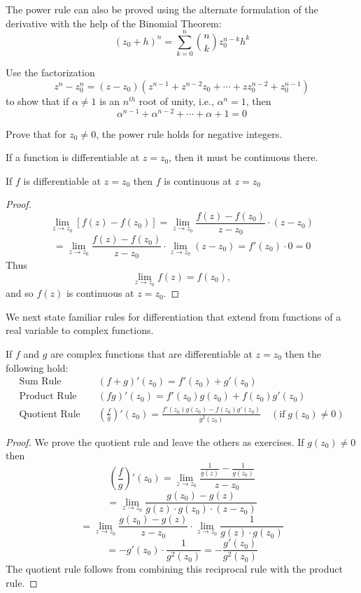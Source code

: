 \documentclass[handout]{ximera}
\begin{document}
\begin{remark}
The power rule can also be proved using the alternate formulation of the derivative with the help of the Binomial Theorem:
\[
(z_0 + h)^n = \sum_{k = 0}^n \binom{n}{k} z_0^{n-k} h^k
\]
\end{remark}


\begin{problem}
Use the factorization 
\[
z^n - z_0^n = (z-z_0)\left(z^{n-1} + z^{n-2}z_0 + \cdots + zz_0^{n-2} + z_0^{n-1} \right)
\]
to show that if $\alpha \neq 1$ is an $n^{th}$ root of unity, i.e., $\alpha^n = 1$, then
\[
\alpha^{n-1} + \alpha^{n-2} + \cdots + \alpha + 1 = 0
\]
\end{problem}

\begin{problem}
Prove that for $z_0 \neq 0$, the power rule holds for negative integers.
\end{problem}

If a function is differentiable at $z= z_0$, then it must be continuous there.
\begin{theorem}
If $f$ is differentiable at $z = z_0$ then $f$ is continuous at $z = z_0$
\end{theorem}
\begin{proof}
\[
\lim_{z\to z_0} \left[f(z) - f(z_0)\right] = \lim_{z\to z_0} \frac{f(z) - f(z_0)}{z-z_0} \cdot (z-z_0)
\]
\[
= \lim_{z\to z_0} \frac{f(z) - f(z_0)}{z-z_0} \cdot \lim_{z\to z_0}(z-z_0) = f'(z_0) \cdot 0 = 0
\]
Thus
\[
 \lim_{z\to z_0} f(z) = f(z_0),
 \]
 and so $f(z)$ is continuous at $z = z_0$.
\end{proof}
We next state familiar rules for differentiation that extend from functions of a real variable to complex functions.

\begin{theorem}
If $f$ and $g$ are complex functions that are differentiable at $z = z_0$ then the following hold:
\begin{align*}
\mbox{Sum Rule} & \quad (f+g)'(z_0) = f'(z_0) + g'(z_0)\\[6 pt]
\mbox{Product Rule} & \quad (fg)'(z_0) = f'(z_0)g(z_0) + f(z_0)g'(z_0)\\[6pt]
\mbox{Quotient Rule} &\quad \left (\frac{f}{g}\right)'(z_0) = \frac{f'(z_0)g(z_0) - f(z_0)g'(z_0)}{g^2(z_0)}\quad (\mbox{if} \; g(z_0) \neq 0)
\end{align*}
\end{theorem}

\begin{proof}
We prove the quotient rule and leave the others as exercises. If $g(z_0) \neq 0$ then
\[
\left(\frac{f}{g}\right)'(z_0) = \lim_{z \to z_0} \frac{\frac{1}{g(z)} - \frac{1}{g(z_0)}}{z-z_0}
\]
\[
= \lim_{z \to z_0} \frac{g(z_0)- g(z)}{g(z)\cdot g(z_0) \cdot(z-z_0)}
\]
\[
= \lim_{z \to z_0} \frac{g(z_0)- g(z)}{z-z_0}   \cdot \lim_{z \to z_0} \frac{1}{g(z)\cdot g(z_0)}
\]
\[
= -g'(z_0) \cdot \frac{1}{g^2(z_0)} = -\frac{g'(z_0)}{g^2(z_0)}
\]
The quotient rule follows from combining this reciprocal rule with the product rule.

\end{proof}
\end{document}
